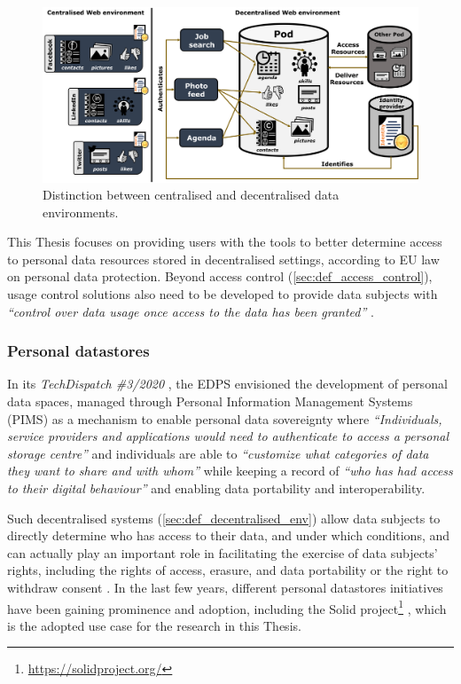 \begin{figure}[h]
    \centering
    \includegraphics[width=\linewidth]{figures/chapter-1/decentralisation.png}
    \caption{Distinction between centralised and decentralised data environments.}
    \label{fig:decentralisation}
\end{figure}

This Thesis focuses on providing users with the tools to better determine access to personal data resources stored in decentralised settings, according to EU law on personal data protection.
Beyond access control (\ref{sec:def_access_control}), usage control solutions also need to be developed to provide data subjects with \textit{``control over data usage once access to the data has been granted''} \citep{akaichi_semantic_2022}.

\subsubsection{Personal datastores}
\label{sec:def_pds}

In its \textit{TechDispatch \#3/2020} \citep{european_data_protection_supervisor_techdispatch_2021}, the EDPS envisioned the development of personal data spaces, managed through Personal Information Management Systems (PIMS) as a mechanism to enable personal data sovereignty where \textit{``Individuals, service providers and applications would need to authenticate to access a personal storage centre''} and individuals are able to \textit{``customize what categories of data they want to share and with whom''} while keeping a record of \textit{``who has had access to their digital behaviour''} and enabling data portability and interoperability.

Such decentralised systems (\ref{sec:def_decentralised_env}) allow data subjects to directly determine who has access to their data, and under which conditions, and can actually play an important role in facilitating the exercise of data subjects’ rights, including the rights of access, erasure, and data portability or the right to withdraw consent \citep{janssen_personal_2020}.
In the last few years, different personal datastores initiatives have been gaining prominence and adoption, including the Solid project\footnote{\url{https://solidproject.org/}} \citep{fallatah_personal_2023}, which is the adopted use case for the research in this Thesis.

